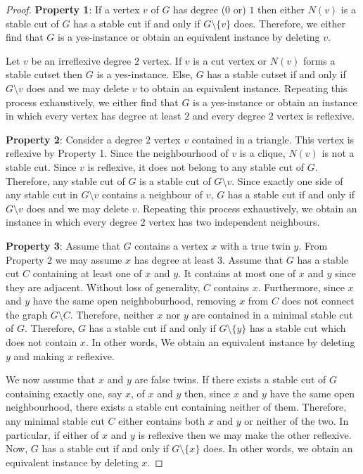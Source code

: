 \documentclass[a4paper,UKenglish,cleveref, autoref,thm-restate]{lipics-v2021}
\begin{document}
\begin{proof}
{\textbf {Property 1}}:
If a vertex $v$ of $G$ has degree ($0$ or) $1$ then either $N(v)$ is a stable cut of $G$ has a stable cut if and only if $G \setminus \{v\}$ does. Therefore, we either find that $G$ is a yes-instance or obtain an equivalent instance by deleting $v$.

Let $v$ be an irreflexive degree $2$ vertex. If $v$ is a cut vertex or $N(v)$ forms a stable cutset then $G$ is a yes-instance. Else, $G$ has a stable cutset if and only if $G \setminus {v}$ does and we may delete $v$ to obtain an equivalent instance. Repeating this process exhaustively, we either find that $G$ is a yes-instance or obtain an instance in which every vertex has degree at least $2$ and every degree $2$ vertex is reflexive.

\textbf{Property 2}:
Consider a degree $2$ vertex $v$ contained in a triangle. This vertex is reflexive by Property 1. Since the neighbourhood of $v$ is a clique, $N(v)$ is not a stable cut. Since $v$ is reflexive, it does not belong to any stable cut of $G$. Therefore, any stable cut of $G$ is a stable cut of $G \setminus v$. Since exactly one side of any stable cut in $G \setminus v$ contains a neighbour of $v$, $G$ has a stable cut if and only if $G \setminus v$ does and we may delete $v$. Repeating this process exhaustively, we obtain an instance in which every degree $2$ vertex has two independent neighbours.

\textbf{Property 3}:
Assume that $G$ contains a vertex $x$ with a true twin $y$. From Property $2$ we may assume $x$ has degree at least $3$. Assume that $G$ has a stable cut $C$ containing at least one of $x$ and $y$. It contains at most one of $x$ and $y$ since they are adjacent. Without loss of generality, $C$ contains $x$. Furthermore, since $x$ and $y$ have the same open neighboburhood, removing $x$ from $C$ does not connect the graph $G \setminus {C}$. Therefore, neither $x$ nor $y$ are contained in a minimal stable cut of $G$. Therefore, $G$ has a stable cut if and only if $G \setminus \{y \}$ has a stable cut which does not contain $x$. In other words, We obtain an equivalent instance by deleting $y$ and making $x$ reflexive.

We now assume that $x$ and $y$ are false twins. If there exists a stable cut of $G$ containing exactly one, say $x$, of $x$ and $y$ then, since $x$ and $y$ have the same open neighbourhood, there exists a stable cut containing neither of them. Therefore, any minimal stable cut $C$ either contains both $x$ and $y$ or neither of the two. In particular, if either of $x$ and $y$ is reflexive then we may make the other reflexive. Now, $G$ has a stable cut if and only if $G \setminus \{x \}$ does. In other words, we obtain an equivalent instance by deleting $x$.


\end{proof}
\end{document}
